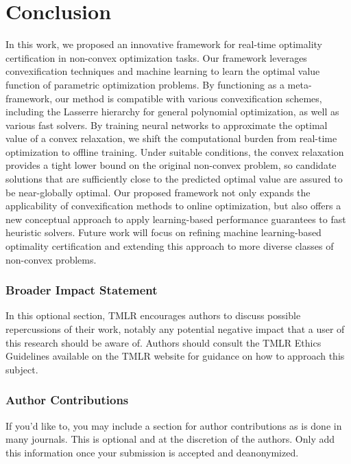 \documentclass[10pt]{article} %
\theoremstyle{plain}
\theoremstyle{definition}
\theoremstyle{remark}
\begin{document}
\section{Conclusion} \label{sec:conclusion}
In this work, we proposed an innovative framework for real-time optimality certification in non-convex optimization tasks.
Our framework leverages convexification techniques and machine learning to learn the optimal value function of parametric optimization problems.
{By functioning as a meta-framework, our method is compatible with various convexification schemes, including the Lasserre hierarchy for general polynomial optimization, as well as various fast solvers.} By training neural networks to approximate the optimal value of a convex relaxation, we shift the computational burden from real-time optimization to offline training. Under suitable conditions, the convex relaxation provides a tight lower bound on the original non-convex problem, so candidate solutions that are sufficiently close to the predicted optimal value are assured to be near-globally optimal.
Our proposed framework not only expands the applicability of convexification methods to online optimization, but also offers a new conceptual approach to apply learning-based performance guarantees to fast heuristic solvers.
Future work will focus on refining machine learning-based optimality certification and extending this approach to more diverse classes of non-convex problems.






\subsubsection*{Broader Impact Statement}
In this optional section, TMLR encourages authors to discuss possible repercussions of their work,
notably any potential negative impact that a user of this research should be aware of. 
Authors should consult the TMLR Ethics Guidelines available on the TMLR website
for guidance on how to approach this subject.

\subsubsection*{Author Contributions}
If you'd like to, you may include a section for author contributions as is done
in many journals. This is optional and at the discretion of the authors. Only add
this information once your submission is accepted and deanonymized. 
\end{document}
